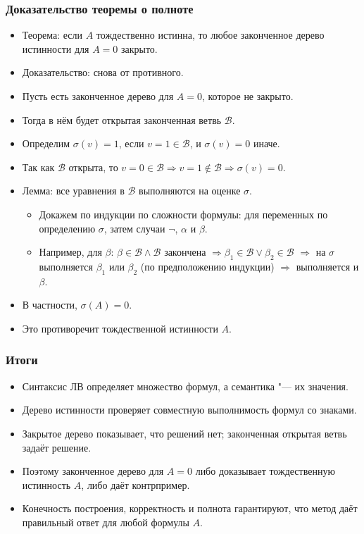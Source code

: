 \documentclass[10pt]{beamer}
\begin{document}
\begin{frame}
    \frametitle{Доказательство теоремы о полноте}
    \begin{itemize}
        \item Теорема: если $A$ тождественно истинна, то любое законченное дерево истинности для $A=0$ закрыто.
        \item Доказательство: снова от противного. 
        \pause
        \item Пусть есть законченное дерево для $A=0$, которое не закрыто.
        \item Тогда в нём будет открытая законченная ветвь $\mathcal{B}$.
        \pause
        \item Определим $\sigma(v)=1$, если $v=1 \in \mathcal{B}$, и $\sigma(v)=0$ иначе.
        \item Так как $\mathcal{B}$ открыта, то $v=0 \in \mathcal{B} \Rightarrow v=1 \not\in \mathcal{B} \Rightarrow \sigma(v)=0$.
        \pause
        \item Лемма: все уравнения в $\mathcal{B}$ выполняются на оценке $\sigma$.
        \pause
        \begin{itemize}
        \item Докажем по индукции по сложности формулы: для переменных по определению $\sigma$, затем случаи $\neg$, $\alpha$ и $\beta$.
        \item Например, для $\beta$: $\beta \in \mathcal{B} \land \mathcal{B}$ закончена $\Rightarrow \beta_1 \in \mathcal{B} \lor \beta_2 \in \mathcal{B}$ $\Rightarrow$ на $\sigma$ выполняется $\beta_1$ или $\beta_2$ (по предположению индукции) $\Rightarrow$ выполняется и $\beta$.
        \end{itemize}
        \pause
        \item В частности, $\sigma(A)=0$.
        \item Это противоречит тождественной истинности $A$.
    \end{itemize}
\end{frame}

\begin{frame}
    \frametitle{Итоги}
    \begin{itemize}
        \item Синтаксис ЛВ определяет множество формул, а семантика "--- их значения.
        \item Дерево истинности проверяет совместную выполнимость формул со знаками.
        \item Закрытое дерево показывает, что решений нет; законченная открытая ветвь задаёт решение.
        \item Поэтому законченное дерево для $A=0$ либо доказывает тождественную истинность $A$, либо даёт контрпример.
        \item Конечность построения, корректность и полнота гарантируют, что метод даёт правильный ответ для любой формулы $A$.
    \end{itemize}
\end{frame}
\end{document}
